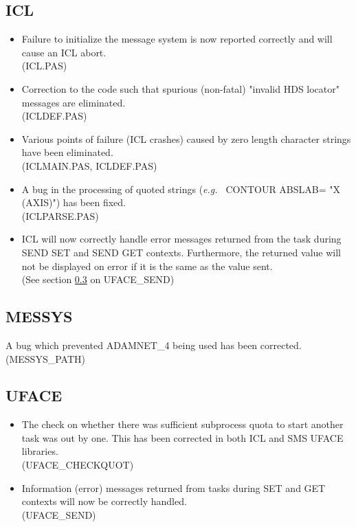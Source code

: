 \subsection{ICL}
\begin{itemize}
\item Failure to initialize the message system is now reported correctly
and will cause an ICL abort.\\
(ICL.PAS)
\item Correction to the code such that spurious (non-fatal) "invalid HDS
locator" messages are eliminated.\\
(ICLDEF.PAS)
\item Various points of failure (ICL crashes) caused by zero length character
strings have been eliminated.\\
(ICLMAIN.PAS, ICLDEF.PAS)
\item A bug in the processing of quoted strings ({\em e.g.\ } CONTOUR ABSLAB=
"X (AXIS)") has been fixed.\\
(ICLPARSE.PAS)
\item ICL will now correctly handle error messages returned from the task
during SEND SET and SEND GET contexts. Furthermore, the returned value will
not be displayed on error if it is the same as the value sent.\\
(See section \ref{ufbugs} on UFACE\_SEND)
\end{itemize}

\subsection{MESSYS}
A bug which prevented ADAMNET\_4 being used has been corrected.\\
(MESSYS\_PATH)

\subsection{UFACE}
\label{ufbugs}
\begin{itemize}
\item The check on whether there was sufficient subprocess quota to start another
task was out by one. This has been corrected in both ICL and SMS UFACE
libraries.\\
(UFACE\_CHECKQUOT)
\item Information (error) messages returned from tasks during SET and GET
contexts will now be correctly handled.\\
(UFACE\_SEND)
\end{itemize}

